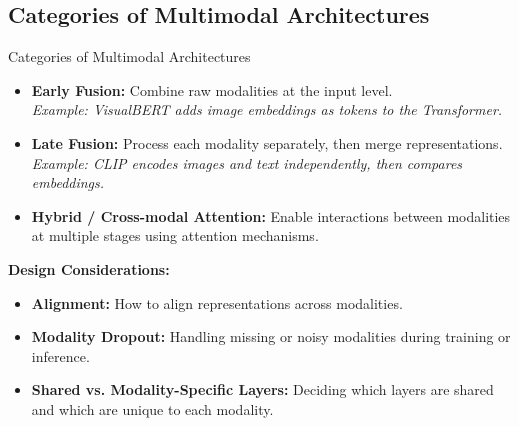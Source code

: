 \subsection{Categories of Multimodal Architectures}
\begin{frame}[allowframebreaks]{Categories of Multimodal Architectures}
    \begin{itemize}
        \item \textbf{Early Fusion:} Combine raw modalities at the input level.\\
        \textit{Example: VisualBERT adds image embeddings as tokens to the Transformer.}
        \item \textbf{Late Fusion:} Process each modality separately, then merge representations.\\
        \textit{Example: CLIP encodes images and text independently, then compares embeddings.}
        \item \textbf{Hybrid / Cross-modal Attention:} Enable interactions between modalities at multiple stages using attention mechanisms.
    \end{itemize}
    \textbf{\faWrench\hspace{0.5em}Design Considerations:}
    \begin{itemize}
        \item \textbf{Alignment:} How to align representations across modalities.
        \item \textbf{Modality Dropout:} Handling missing or noisy modalities during training or inference.
        \item \textbf{Shared vs. Modality-Specific Layers:} Deciding which layers are shared and which are unique to each modality.
    \end{itemize}
\end{frame}


